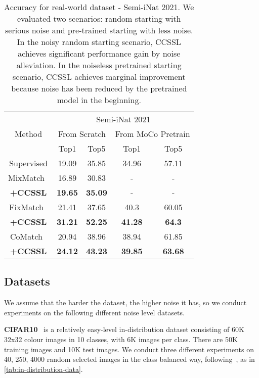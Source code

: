 \documentclass[10pt,twocolumn,letterpaper]{article}
\begin{document}
\begin{table}
\centering
\begin{tabular}{c|cc|cc}
\toprule
    \multirow{3}{*}{Method} &
    \multicolumn{4}{c}{Semi-iNat 2021} \\
& \multicolumn{2}{c|}{From Scratch} & 
    \multicolumn{2}{C{2cm}}{From MoCo Pretrain} \\
\cline{2-5}
& Top1 & Top5 & Top1 & Top5 \\
\midrule
Supervised & 19.09 & 35.85 & 34.96 & 57.11 \\
\hline
MixMatch~\cite{berthelot2019mixmatch} & 16.89 & 30.83 & - & - \\
\hspace{0.5cm}\textbf{+CCSSL} & \textbf{19.65} & \textbf{35.09} & -  & - \\
\hline
FixMatch~\cite{sohn2020fixmatch} & 21.41 & 37.65 & 40.3 & 60.05 \\
\hspace{0.5cm}\textbf{+CCSSL} & \textbf{31.21} & \textbf{52.25} & \textbf{41.28} & \textbf{64.3} \\
\hline
CoMatch~\cite{li2021comatch} & 20.94 & 38.96 & 38.94 & 61.85 \\
\hspace{0.5cm}\textbf{+CCSSL} & \textbf{24.12} & \textbf{43.23} & \textbf{39.85} & \textbf{63.68} \\
\bottomrule
\end{tabular}
\caption{Accuracy for real-world dataset - Semi-iNat 2021. We evaluated two scenarios: random starting with serious noise and pre-trained starting with less noise. In the noisy random starting scenario, CCSSL achieves significant performance gain by noise alleviation.  In the noiseless pretrained starting scenario, CCSSL achieves marginal improvement because noise has been reduced by the pretrained model in the beginning.}
\label{tab:out-class-data}
\end{table}

\subsection{Datasets}
We assume that the harder the dataset, the higher noise it has, so we conduct experiments on the following different noise level datasets.  


\textbf{CIFAR10}~\cite{krizhevsky2009learning} is a relatively easy-level in-distribution dataset consisting of 60K 32x32 colour images in 10 classes, with 6K images per class. 
There are 50K training images and 10K test images. We conduct three different experiments on 40, 250, 4000 random selected images in the class balanced way, following~\cite{sohn2020fixmatch}, as in \cref{tab:in-distribution-data}.  
\end{document}
